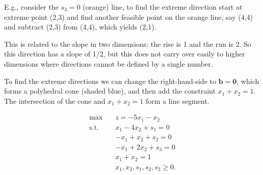 
\medskip E.g., consider the $s_3=0$ (orange) line, to find the extreme direction start at extreme point (2,3) and find another feasible point on the orange line, say (4,4) and subtract (2,3) from (4,4), which yields (2,1).

\medskip This is related to the slope in two dimensions: the rise is 1 and the run is 2. So this direction has a slope of 1/2, but this does not carry over easily to higher dimensions where directions cannot be defined by a single number.

\medskip To find the extreme directions we can change the right-hand-side to $\mathbf{b} = \mathbf{0}$, which forms a polyhedral cone (shaded blue), and then add the constraint $x_1 + x_2 = 1$. The intersection of the cone and  $x_1 + x_2 = 1$ form a line segment.

\begin{minipage}[t][][b]{.4\linewidth} \vspace{0mm}
\begin{align*}
\max \quad & z = -5x_1 - x_2  \\
\text{s.t.} \quad & x_1 - 4x_2 +s_1 = 0  \\
& -x_1 + x_2 + s_2 = 0 \\
& -x_1 + 2x_2 +s_3 = 0 \\
& x_1 + x_2 = 1 \\
& x_1, x_2, s_1, s_2, s_3 \ge 0.
\end{align*}
\end{minipage}%
\begin{minipage}[t][][b]{.6\linewidth}
\begin{center} \par{}\label{fig:Section2-tikz13}%
 \end{center}
\end{minipage}

